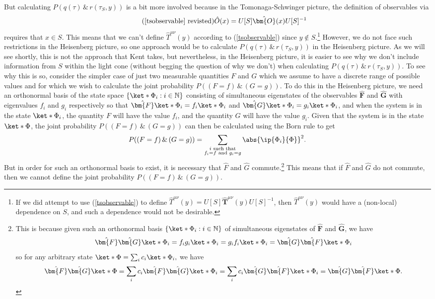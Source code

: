 \documentclass[12pt]{report}
\begin{document}
 But calculating $P(q(\tau) \, \&\,  r(\tau_S,y))$ is a bit more involved because in the Tomonaga-Schwinger picture, the definition of observables via 
 \begin{equation}\tag{\ref{tsobservable} revisted}
  \hat{O}(x)=U[S]\hat{\bm{O}}(x)U[S]^{-1}
\end{equation}
requires that $x\in S$.
This means that we can't define $\hat{T}^{\mu\nu}(y)$ according to (\ref{tsobservable}) since $y\not\in S$.\footnote{If we did attempt to use (\ref{tsobservable}) to define $\hat{T}^{\mu\nu}(y)=U[S]\hat{\bm{T}}^{{\mu\nu}}(y)U[S]^{-1}$, then $\hat{T}^{\mu\nu}(y)$ would have a (non-local) dependence on $S$, and such a dependence would not be desirable.} However, we do not face such restrictions in the Heisenberg picture, so one approach would be to calculate $P(q(\tau) \, \&\,  r(\tau_S,y))$ in the Heisenberg picture. As we will see shortly, this is not the approach that Kent takes, but nevertheless, in the Heisenberg picture, it is easier to see why we don't include information from $S$ within the light cone (without begging the question of why we don't) when calculating $P(q(\tau) \, \&\,  r(\tau_S,y))$. To see why this is so, consider the simpler case of just two measurable quantities ${F}$ and ${G}$ which we assume to have a discrete range of possible values and for which we wish to calculate the joint probability $P((F=f)\, \&\, (G=g))$. To do this in the Heisenberg picture, we need an orthonormal basis of the state space $\{\ket*{\Phi_{i}}:i\in\mathbb{N}\}$ consisting of simultaneous eigenstates of the observables $\hat{\bm{F}}$ and $\hat{\bm{G}}$ with eigenvalues $f_{i}$ and $g_{i}$ respectively so that $\hat{\bm{F}}\ket*{\Phi_{i}}=f_{i}\ket*{\Phi_{i}}$ and $\hat{\bm{G}}\ket*{\Phi_{i}}=g_{i}\ket*{\Phi_{i}}$, and when the system is in the state $\ket*{\Phi_{i}}$, the quantity $F$ will have the value $f_{i}$, and the quantity $G$ will have the value $g_{i}$. Given that the system is in the state $\ket*{\Phi}$, the joint probability $P((F=f)\, \&\, (G=g))$ can then be calculated using the Born rule to get
$$P((F=f)\, \&\, (G=g))=\sum_{\substack{i \text{ such that} \\ f_{i}=f \text{ and } g_{i}=g}}\abs{\ip{\Phi_{i}}{\Phi}}^2.$$
But  in order for such an orthonormal basis to exist, it is necessary that $\hat{F}$ and $\hat{G}$ commute.\footnote{This is because given such an orthonormal basis $\{\ket*{\Phi_{i}}:i\in\mathbb{N}\}$ of simultaneous eigenstates of $\hat{\bm{F}}$ and $\hat{\bm{G}}$, we have 
$$\hat{\bm{F}}\hat{\bm{G}}\ket*{\Phi_{i}}=f_{i}g_{i}\ket*{\Phi_{i}}=g_{i}f_{i}\ket*{\Phi_{i}}=\hat{\bm{G}}\hat{\bm{F}}\ket*{\Phi_{i}}$$ so for any arbitrary state $\ket*{\Phi}=\sum_i c_i \ket*{\Phi_{i}},$ we have 
$$\hat{\bm{F}}\hat{\bm{G}}\ket*{\Phi}=\sum_i c_i \hat{\bm{F}}\hat{\bm{G}}\ket*{\Phi_{i}}= \sum_i c_i \hat{\bm{G}}\hat{\bm{F}}\ket*{\Phi_{i}}=\hat{\bm{G}}\hat{\bm{F}}\ket*{\Phi}.$$ 
} This means that if $\hat{F}$ and $\hat{G}$ do not commute, then we cannot define the joint probability $P((F=f)\, \&\, (G=g)).$
\end{document}
